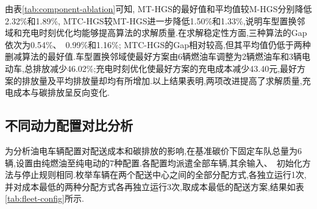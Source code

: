 \documentclass{setp-new}
\begin{document}
由表\ref{tab:component-ablation}可知, MT-HGS的最好值和平均值较M-HGS分别降低2.32\%和1.89\%, MTC-HGS较MT-HGS进一步降低1.50\%和1.33\%,说明车型置换邻域和充电时刻优化均能够提高算法的求解质量.在求解稳定性方面,三种算法的Gap依次为0.54\%、~0.99\%和1.16\%; MTC-HGS的Gap相对较高,但其平均值仍低于两种删减算法的最好值.车型置换邻域使最好方案由6辆燃油车调整为2辆燃油车和3辆电动车,总排放减少46.02\%;充电时刻优化使最好方案的充电成本减少43.40元,最好方案的排放量及平均排放量却均有所增加.以上结果表明,两项改进提高了求解质量,充电成本与碳排放呈反向变化.

\subsection{不同动力配置对比分析}

为分析油电车辆配置对配送成本和碳排放的影响,在基准碳价下固定车队总量为6辆,设置由纯燃油至纯电动的7种配置.各配置均派遣全部车辆,其余输入、~初始化方法与停止规则相同.枚举车辆在两个配送中心之间的全部分配方式,各独立运行1次,并对成本最低的两种分配方式各再独立运行3次,取成本最低的配送方案,结果如表\ref{tab:fleet-config}所示.
\end{document}
